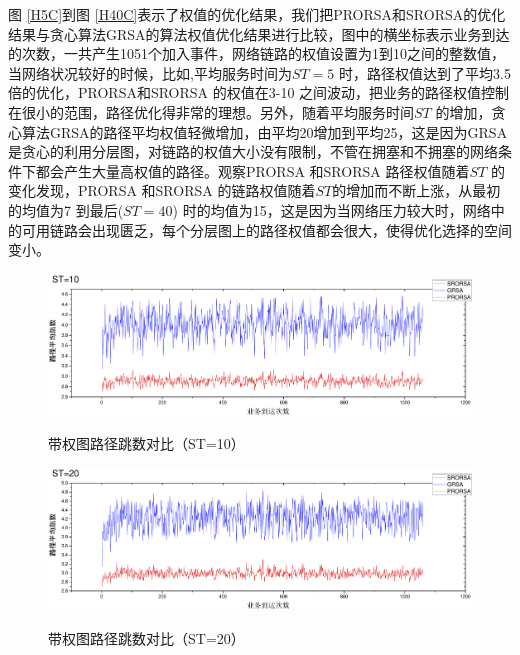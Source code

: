 图 \ref{H5C}到图 \ref{H40C}表示了权值的优化结果，我们把PRORSA和SRORSA的优化结果与贪心算法GRSA的算法权值优化结果进行比较，图中的横坐标表示业务到达的次数，一共产生1051个加入事件，网络链路的权值设置为1到10之间的整数值，当网络状况较好的时候，比如,平均服务时间为$ST=5$ 时，路径权值达到了平均3.5倍的优化，PRORSA和SRORSA 的权值在3-10 之间波动，把业务的路径权值控制在很小的范围，路径优化得非常的理想。另外，随着平均服务时间$ST$ 的增加，贪心算法GRSA的路径平均权值轻微增加，由平均20增加到平均25，这是因为GRSA 是贪心的利用分层图，对链路的权值大小没有限制，不管在拥塞和不拥塞的网络条件下都会产生大量高权值的路径。观察PRORSA 和SRORSA 路径权值随着$ST$ 的变化发现，PRORSA 和SRORSA 的链路权值随着$ST$的增加而不断上涨，从最初的均值为7 到最后($ST=40$) 时的均值为15，这是因为当网络压力较大时，网络中的可用链路会出现匮乏，每个分层图上的路径权值都会很大，使得优化选择的空间变小。
\begin{figure}
\setlength{\belowcaptionskip}{-0.5cm}
\begin{center}
{\includegraphics[width=1 \textwidth]{figures/H10H.pdf}}
\end{center}
\caption{{\footnotesize{带权图路径跳数对比（ST=10）}}}
\label{H10H}
\end{figure}
\begin{figure}
\setlength{\belowcaptionskip}{-0.5cm}
\begin{center}
{\includegraphics[width=1 \textwidth]{figures/H20H.pdf}}
\end{center}
\caption{{\footnotesize{带权图路径跳数对比（ST=20）}}}
\label{H20H}
\end{figure}
